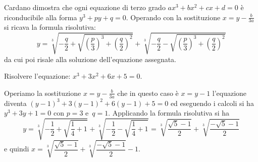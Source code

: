 Cardano dimostra che ogni equazione di terzo grado \(ax^3+bx^2+cx+d=0\) è 
riconducibile alla forma \(y^3+{py}+q=0\). Operando con la sostituzione 
\(x=y-\frac 
b{3a}\) si ricava la formula risolutiva: 
\[y=\sqrt[3]{-\frac q 2+\sqrt{\left(\frac p 3\right)^3+\left(\frac q 
2\right)^2}}+\sqrt[3]{-\frac q 2-\sqrt{\left(\frac p 3\right)^3+\left(\frac q 
2\right)^2}}\] 
da cui poi risale alla soluzione dell'equazione assegnata.
\begin{esempio}
Risolvere l'equazione: \(x^3+3x^2+6x+5=0\).

Operiamo la sostituzione \(x=y-\frac b{3a}\) che in questo caso è \(x=y-1\) 
l'equazione diventa \((y-1)^3+3(y-1)^2+6(y-1)+5=0\) ed eseguendo i calcoli si ha 
\(y^3+3y+1=0\) con \(p=3\) e~\(q=1\).
Applicando la formula risolutiva si ha 
\[y=\sqrt[3]{-\frac 1 2+\sqrt{\frac 1 4+1}}+\sqrt[3]{-\frac 1 2-\sqrt{\frac 1 
4+1}}=\sqrt[3]{\frac{\sqrt 5-1} 2}+\sqrt[3]{\frac{-\sqrt 5-1} 2}\] 
e quindi \(x=\sqrt[3]{\dfrac{\sqrt 5-1} 2}+\sqrt[3]{\dfrac{-\sqrt 5-1} 2}-1\).
\end{esempio}

